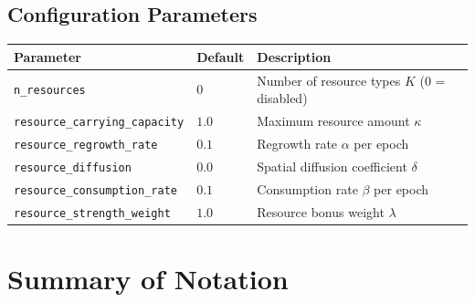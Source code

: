 \documentclass[11pt,a4paper]{article}
\theoremstyle{definition}
\begin{document}
\subsection{Configuration Parameters}

\begin{center}
\begin{tabular}{llp{7cm}}
    \toprule
    Parameter & Default & Description \\
    \midrule
    \texttt{n\_resources} & $0$ & Number of resource types $K$ (0 = disabled) \\
    \texttt{resource\_carrying\_capacity} & $1.0$ & Maximum resource amount $\kappa$ \\
    \texttt{resource\_regrowth\_rate} & $0.1$ & Regrowth rate $\alpha$ per epoch \\
    \texttt{resource\_diffusion} & $0.0$ & Spatial diffusion coefficient $\delta$ \\
    \texttt{resource\_consumption\_rate} & $0.1$ & Consumption rate $\beta$ per epoch \\
    \texttt{resource\_strength\_weight} & $1.0$ & Resource bonus weight $\lambda$ \\
    \bottomrule
\end{tabular}
\end{center}

\section{Summary of Notation}
\end{document}
